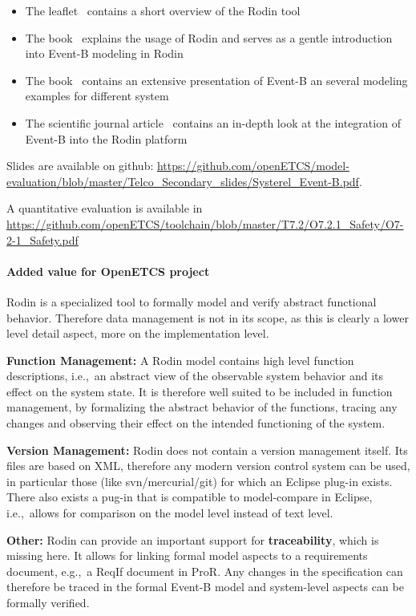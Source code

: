 \begin{itemize}
\item The leaflet~\cite{RodinLeaflet} contains a short overview of the Rodin
  tool
\item The book~\cite{RodinHandbook} explains the usage of Rodin and serves as a
  gentle introduction into Event-B modeling in Rodin
\item The book~\cite{Abrial:2010:MES:1855020} contains an extensive presentation
  of Event-B an several modeling examples for different system
\item The scientific journal article~\cite{AbrialBHHMV10} contains an in-depth
  look at the integration of Event-B into the Rodin platform
\end{itemize}


Slides are available on github: \url{https://github.com/openETCS/model-evaluation/blob/master/Telco_Secondary_slides/Systerel_Event-B.pdf}.

A quantitative evaluation is available in \url{https://github.com/openETCS/toolchain/blob/master/T7.2/O7.2.1_Safety/O7-2-1_Safety.pdf}

\paragraph{Added value for OpenETCS project}


 Rodin is a specialized tool to formally model and verify abstract functional
  behavior. Therefore data management is not in its scope, as this is clearly a
  lower level detail aspect, more on the implementation level.

  \textbf{Function Management:} A Rodin model contains high level function
  descriptions, i.e.,\ an abstract view of the observable system behavior and
  its effect on the system state. It is therefore well suited to be included in
  function management, by formalizing the abstract behavior of the functions,
  tracing any changes and observing their effect on the intended functioning of
  the system.

  \textbf{Version Management:} Rodin does not contain a version management
  itself. Its files are based on XML, therefore any modern version control
  system can be used, in particular those (like svn/mercurial/git) for which an
  Eclipse plug-in exists. There also exists a pug-in that is compatible to
  model-compare in Eclipse, i.e.,\ allows for comparison on the model level
  instead of text level.

  \textbf{Other:} Rodin can provide an important support for
  \textbf{traceability}, which is missing here. It allows for linking formal
  model aspects to a requirements document, e.g.,\ a ReqIf document in ProR. Any
  changes in the specification can therefore be traced in the formal Event-B
  model and system-level aspects can be formally verified.

